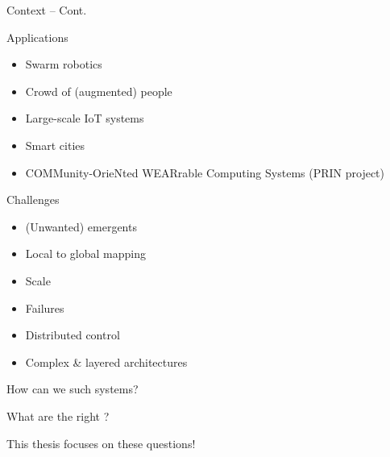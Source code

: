 \documentclass[presentation, 8pt,169]{beamer}\mode<presentation>{\usetheme{AMSBolognaFC}}
\begin{document}
\begin{frame}{Context -- Cont.}
\begin{alertblock}{Applications}
  \begin{multicols}{3}
    \begin{itemize}
      \item Swarm robotics
      \item Crowd of (augmented) people
      \item Large-scale IoT systems
      \item Smart cities
      \item COMMunity-OrieNted WEARrable Computing Systems (PRIN project)
    \end{itemize}
  \end{multicols}
\end{alertblock}

\begin{block}{Challenges}
  \begin{multicols}{3}
    \begin{itemize}
      \item (Unwanted) emergents
      \item Local to global mapping
      \item Scale
      \item Failures
      \item Distributed control
      \item Complex \& layered architectures
    \end{itemize}
  \end{multicols}
\end{block}
\begin{center}
  \Large{How can we  such systems?}
  \end{center}
  \begin{center}
    \Large{What are the right ?}
  \end{center}
  \begin{center}
    \Large{This thesis focuses on these questions!}
  \end{center}
\centering
\end{frame}
\end{document}
